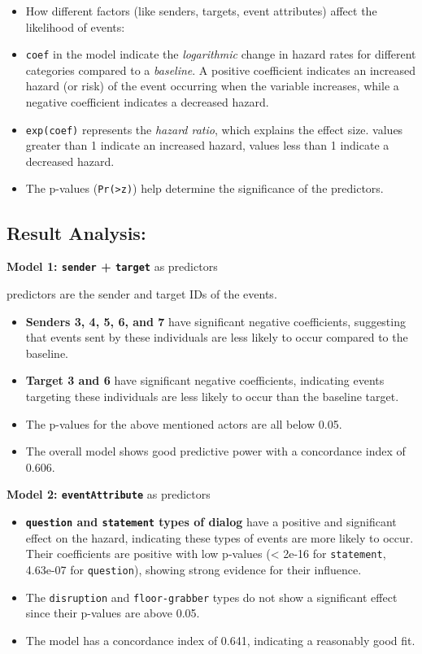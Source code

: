 \documentclass[
]{article}
\providecommand{\tightlist}{%
  \setlength{\itemsep}{0pt}\setlength{\parskip}{0pt}}
\begin{document}
\begin{itemize}
\item
  How different factors (like senders, targets, event attributes) affect
  the likelihood of events:
\item
  \texttt{coef} in the model indicate the \emph{logarithmic} change in
  hazard rates for different categories compared to a \emph{baseline}. A
  positive coefficient indicates an increased hazard (or risk) of the
  event occurring when the variable increases, while a negative
  coefficient indicates a decreased hazard.
\item
  \texttt{exp(coef)} represents the \emph{hazard ratio}, which explains
  the effect size. values greater than 1 indicate an increased hazard,
  values less than 1 indicate a decreased hazard.
\item
  The p-values (\texttt{Pr(\textgreater{}\textbar{}z\textbar{})}) help
  determine the significance of the predictors.
\end{itemize}

\hypertarget{result-analysis}{%
\subsection{Result Analysis:}\label{result-analysis}}

\textbf{Model 1: \texttt{sender} + \texttt{target}} as predictors

predictors are the sender and target IDs of the events.

\begin{itemize}
\tightlist
\item
  \textbf{Senders 3, 4, 5, 6, and 7} have significant negative
  coefficients, suggesting that events sent by these individuals are
  less likely to occur compared to the baseline.
\item
  \textbf{Target 3 and 6} have significant negative coefficients,
  indicating events targeting these individuals are less likely to occur
  than the baseline target.
\item
  The p-values for the above mentioned actors are all below 0.05.
\item
  The overall model shows good predictive power with a concordance index
  of 0.606.
\end{itemize}

\textbf{Model 2: \texttt{eventAttribute}} as predictors

\begin{itemize}
\tightlist
\item
  \textbf{\texttt{question} and \texttt{statement} types of dialog} have
  a positive and significant effect on the hazard, indicating these
  types of events are more likely to occur. Their coefficients are
  positive with low p-values (\textless{} 2e-16 for \texttt{statement},
  4.63e-07 for \texttt{question}), showing strong evidence for their
  influence.
\item
  The \texttt{disruption} and \texttt{floor-grabber} types do not show a
  significant effect since their p-values are above 0.05.
\item
  The model has a concordance index of 0.641, indicating a reasonably
  good fit.
\end{itemize}
\end{document}
